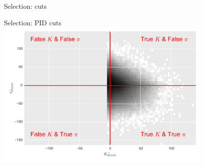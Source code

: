 \documentclass[compress,aspectratio=1610]{beamer}
\begin{document}
\begin{frame}{Selection: \PJpsi cuts}
  \centering
\end{frame}

\begin{frame}{Selection: PID cuts}
  \centering
  \includegraphics[width=0.8\textwidth]{figures/pid_plot.pdf}
\end{frame}
\end{document}
